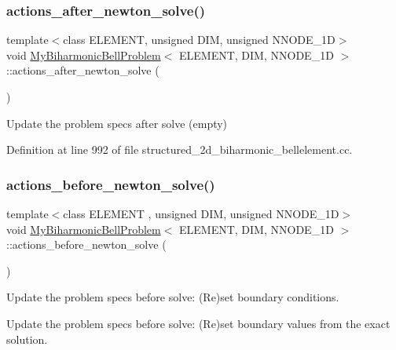 \subsubsection{\texorpdfstring{actions\+\_\+after\+\_\+newton\+\_\+solve()}{actions\_after\_newton\_solve()}}
{\footnotesize\ttfamily template$<$class E\+L\+E\+M\+E\+NT, unsigned D\+IM, unsigned N\+N\+O\+D\+E\+\_\+1D$>$ \\
void \hyperlink{classMyBiharmonicBellProblem}{My\+Biharmonic\+Bell\+Problem}$<$ E\+L\+E\+M\+E\+NT, D\+IM, N\+N\+O\+D\+E\+\_\+1D $>$\+::actions\+\_\+after\+\_\+newton\+\_\+solve (\begin{DoxyParamCaption}{ }\end{DoxyParamCaption})\hspace{0.3cm}{\ttfamily [inline]}}



Update the problem specs after solve (empty) 



Definition at line 992 of file structured\+\_\+2d\+\_\+biharmonic\+\_\+bellelement.\+cc.

\mbox{\label{classMyBiharmonicBellProblem_acdbf06c4f8cf70ee89cd8f1002da98e8}} 
\subsubsection{\texorpdfstring{actions\+\_\+before\+\_\+newton\+\_\+solve()}{actions\_before\_newton\_solve()}}
{\footnotesize\ttfamily template$<$class E\+L\+E\+M\+E\+NT , unsigned D\+IM, unsigned N\+N\+O\+D\+E\+\_\+1D$>$ \\
void \hyperlink{classMyBiharmonicBellProblem}{My\+Biharmonic\+Bell\+Problem}$<$ E\+L\+E\+M\+E\+NT, D\+IM, N\+N\+O\+D\+E\+\_\+1D $>$\+::actions\+\_\+before\+\_\+newton\+\_\+solve (\begin{DoxyParamCaption}{ }\end{DoxyParamCaption})}



Update the problem specs before solve\+: (Re)set boundary conditions. 

Update the problem specs before solve\+: (Re)set boundary values from the exact solution. 

